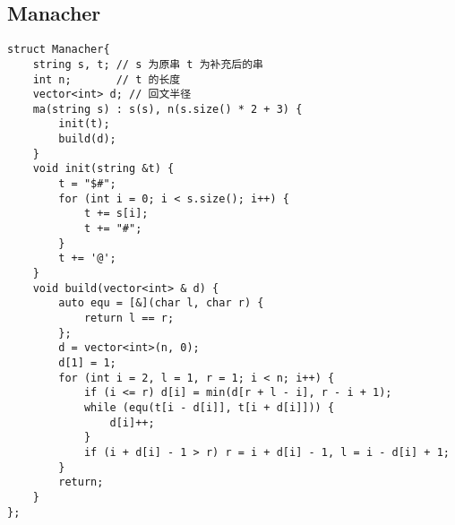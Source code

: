 \subsection{Manacher}
\begin{lstlisting}
struct Manacher{
    string s, t; // s 为原串 t 为补充后的串
    int n;       // t 的长度
    vector<int> d; // 回文半径
    ma(string s) : s(s), n(s.size() * 2 + 3) {
        init(t);
        build(d);
    }
    void init(string &t) {
        t = "$#";
        for (int i = 0; i < s.size(); i++) {
            t += s[i];
            t += "#";
        }
        t += '@';
    }
    void build(vector<int> & d) {
        auto equ = [&](char l, char r) {
            return l == r;
        };
        d = vector<int>(n, 0);
        d[1] = 1;
        for (int i = 2, l = 1, r = 1; i < n; i++) {
            if (i <= r) d[i] = min(d[r + l - i], r - i + 1);
            while (equ(t[i - d[i]], t[i + d[i]])) {
                d[i]++;
            }
            if (i + d[i] - 1 > r) r = i + d[i] - 1, l = i - d[i] + 1;
        }
        return;
    }
};
\end{lstlisting}